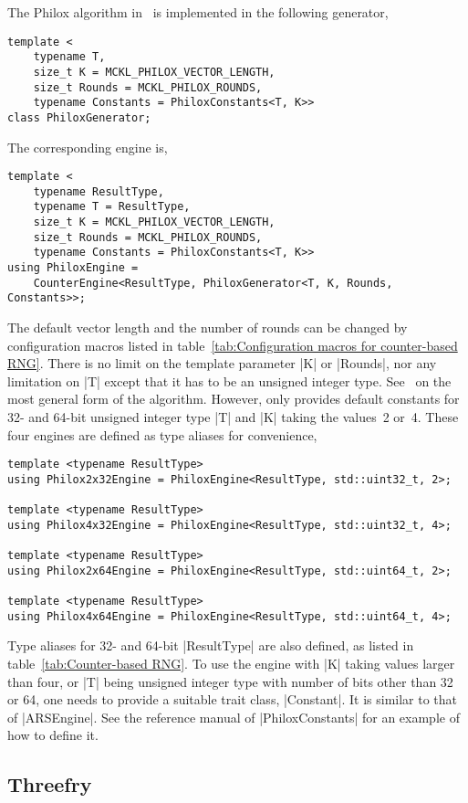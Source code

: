The Philox algorithm in~\cite{Salmon:2011um} is implemented in the following
generator,
\begin{Verbatim}
template <
    typename T,
    size_t K = MCKL_PHILOX_VECTOR_LENGTH,
    size_t Rounds = MCKL_PHILOX_ROUNDS,
    typename Constants = PhiloxConstants<T, K>>
class PhiloxGenerator;
\end{Verbatim}
The corresponding \rng engine is,
\begin{Verbatim}
template <
    typename ResultType,
    typename T = ResultType,
    size_t K = MCKL_PHILOX_VECTOR_LENGTH,
    size_t Rounds = MCKL_PHILOX_ROUNDS,
    typename Constants = PhiloxConstants<T, K>>
using PhiloxEngine =
    CounterEngine<ResultType, PhiloxGenerator<T, K, Rounds, Constants>>;
\end{Verbatim}
The default vector length and the number of rounds can be changed by
configuration macros listed in table~\ref{tab:Configuration macros for
counter-based RNG}. There is no limit on the template parameter |K| or
|Rounds|, nor any limitation on |T| except that it has to be an unsigned
integer type. See~\cite{Salmon:2011um} on the most general form of the
algorithm. However, \mckl only provides default constants for 32- and 64-bit
unsigned integer type |T| and |K| taking the values~2 or~4. These four engines
are defined as type aliases for convenience,
\begin{Verbatim}
template <typename ResultType>
using Philox2x32Engine = PhiloxEngine<ResultType, std::uint32_t, 2>;

template <typename ResultType>
using Philox4x32Engine = PhiloxEngine<ResultType, std::uint32_t, 4>;

template <typename ResultType>
using Philox2x64Engine = PhiloxEngine<ResultType, std::uint64_t, 2>;

template <typename ResultType>
using Philox4x64Engine = PhiloxEngine<ResultType, std::uint64_t, 4>;
\end{Verbatim}
Type aliases for 32- and 64-bit |ResultType| are also defined, as listed in
table~\ref{tab:Counter-based RNG}. To use the engine with |K| taking values
larger than four, or |T| being unsigned integer type with number of bits other
than 32 or 64, one needs to provide a suitable trait class, |Constant|. It is
similar to that of |ARSEngine|. See the reference manual of |PhiloxConstants|
for an example of how to define it.

\subsection{Threefry}
\label{sub:Threefry}

